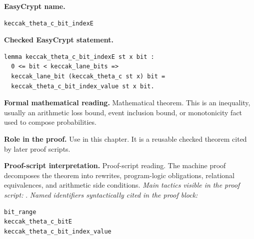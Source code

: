 \begin{formaltheorem}
\noindent\textbf{EasyCrypt name.}
\begin{lstlisting}[language=EasyCrypt,basicstyle=\ttfamily\scriptsize]
keccak_theta_c_bit_indexE
\end{lstlisting}
\noindent\textbf{Checked EasyCrypt statement.}
\begin{lstlisting}[language=EasyCrypt,basicstyle=\ttfamily\scriptsize]
lemma keccak_theta_c_bit_indexE st x bit :
  0 <= bit < keccak_lane_bits =>
  keccak_lane_bit (keccak_theta_c st x) bit =
  keccak_theta_c_bit_index_value st x bit.
\end{lstlisting}
\noindent\textbf{Formal mathematical reading.}
Mathematical theorem. This is an inequality, usually an arithmetic loss bound, event inclusion bound, or monotonicity fact used to compose probabilities.

\noindent\textbf{Role in the proof.}
Use in this chapter. It is a reusable checked theorem cited by later proof scripts.

\noindent\textbf{Proof-script interpretation.}
Proof-script reading. The machine proof decomposes the theorem into rewrites, program-logic obligations, relational equivalences, and arithmetic side conditions.
\emph{Main tactics visible in the proof script:} .
\emph{Named identifiers syntactically cited in the proof block:}
\begin{lstlisting}[language=EasyCrypt,basicstyle=\ttfamily\scriptsize]
bit_range
keccak_theta_c_bitE
keccak_theta_c_bit_index_value
\end{lstlisting}

\end{formaltheorem}

